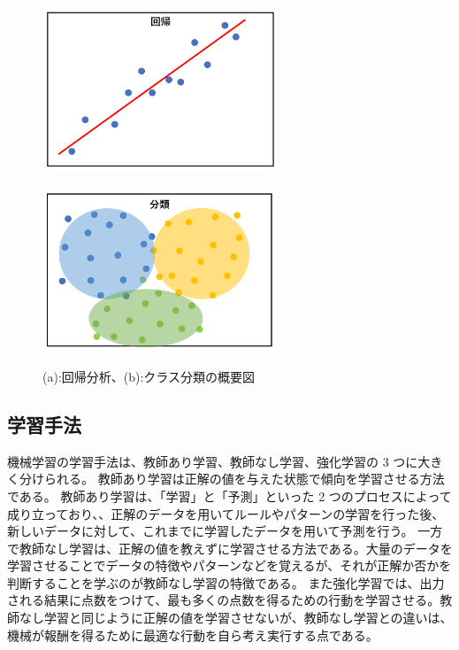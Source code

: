 \begin{figure}[tb]
  \centering
    \begin{minipage}[b]{0.4\linewidth}
        \centering
        \includegraphics[clip, width=7cm]{fig/4/regression.png}
        \vspace{10pt}
        \subcaption{}
        \label{fig:regre}
    \end{minipage}
    \hfill
    \begin{minipage}[b]{0.4\linewidth}
        \centering
        \includegraphics[clip, width=7cm]{fig/4/classification.png}
        \vspace{10pt}
        \subcaption{}
        \label{fig:class}
    \end{minipage}
  \caption{(a):回帰分析、(b):クラス分類の概要図}
  \label{fig:fit_def}
\end{figure}

\subsection{学習手法}
機械学習の学習手法は、教師あり学習、教師なし学習、強化学習の 3 つに大きく分けられる。
教師あり学習は正解の値を与えた状態で傾向を学習させる方法である。
教師あり学習は、「学習」と「予測」といった 2 つのプロセスによって成り立っており、、正解のデータを用いてルールやパターンの学習を行った後、新しいデータに対して、これまでに学習したデータを用いて予測を行う。
一方で教師なし学習は、正解の値を教えずに学習させる方法である。大量のデータを学習させることでデータの特徴やパターンなどを覚えるが、それが正解か否かを判断することを学ぶのが教師なし学習の特徴である。
また強化学習では、出力される結果に点数をつけて、最も多くの点数を得るための行動を学習させる。教師なし学習と同じように正解の値を学習させないが、教師なし学習との違いは、機械が報酬を得るために最適な行動を自ら考え実行する点である。

